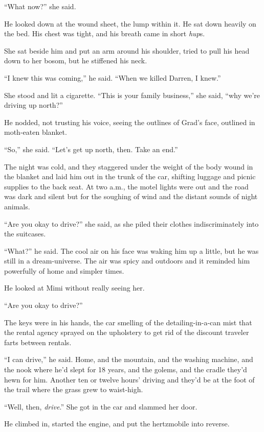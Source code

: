 ``What now?'' she said.

He looked down at the wound sheet, the lump within it.  He sat down
heavily on the bed.  His chest was tight, and his breath came in short
\textit{hup}s.

She sat beside him and put an arm around his shoulder, tried to pull
his head down to her bosom, but he stiffened his neck.

``I knew this was coming,'' he said.  ``When we killed Darren, I
knew.''

She stood and lit a cigarette.  ``This is your family business,'' she
said, ``why we're driving up north?''

He nodded, not trusting his voice, seeing the outlines of Grad's face,
outlined in moth-eaten blanket.

``So,'' she said.  ``Let's get up north, then.  Take an end.''

The night was cold, and they staggered under the weight of the body
wound in the blanket and laid him out in the trunk of the car,
shifting luggage and picnic supplies to the back seat.  At two a.m.,
the motel lights were out and the road was dark and silent but for the
soughing of wind and the distant sounds of night animals.

``Are you okay to drive?'' she said, as she piled their clothes
indiscriminately into the suitcases.

``What?'' he said.  The cool air on his face was waking him up a
little, but he was still in a dream-universe.  The air was spicy and
outdoors and it reminded him powerfully of home and simpler times.

He looked at Mimi without really seeing her.

``Are you okay to drive?''

The keys were in his hands, the car smelling of the detailing-in-a-can
mist that the rental agency sprayed on the upholstery to get rid of
the discount traveler farts between rentals.

``I can drive,'' he said.  Home, and the mountain, and the washing
machine, and the nook where he'd slept for 18 years, and the golems,
and the cradle they'd hewn for him.  Another ten or twelve hours'
driving and they'd be at the foot of the trail where the grass grew to
waist-high.

``Well, then, \textit{drive}.'' She got in the car and slammed her
door.

He climbed in, started the engine, and put the hertzmobile into
reverse.

